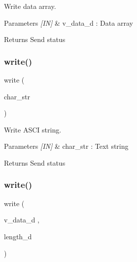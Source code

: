 Write data array. 


\begin{DoxyCode}{0}
\end{DoxyCode}



\begin{DoxyParams}{Parameters}
{\em \mbox{[}\+I\+N\mbox{]}} & v\+\_\+data\+\_\+d \+: Data array \\
\hline
\end{DoxyParams}
\begin{DoxyReturn}{Returns}
Send status 
\end{DoxyReturn}
\mbox{\label{classuart_aa6c744f9ea627c18aa89f38733d5e82d}} 
\subsubsection{write()\hspace{0.1cm}{\footnotesize\ttfamily [3/4]}}
{\footnotesize\ttfamily write (\begin{DoxyParamCaption}\item[{char\+\_\+str}]{ }\end{DoxyParamCaption})}



Write A\+S\+CI string. 


\begin{DoxyCode}{0}
\end{DoxyCode}



\begin{DoxyParams}{Parameters}
{\em \mbox{[}\+I\+N\mbox{]}} & char\+\_\+str \+: Text string \\
\hline
\end{DoxyParams}
\begin{DoxyReturn}{Returns}
Send status 
\end{DoxyReturn}
\mbox{\label{classuart_ab38f66cd3b846fe15f8100bd1d29b8be}} 
\subsubsection{write()\hspace{0.1cm}{\footnotesize\ttfamily [4/4]}}
{\footnotesize\ttfamily write (\begin{DoxyParamCaption}\item[{v\+\_\+data\+\_\+d}]{,  }\item[{length\+\_\+d}]{ }\end{DoxyParamCaption})}



